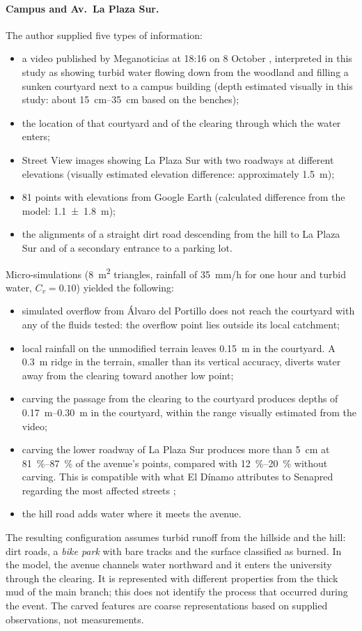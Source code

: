 \paragraph{Campus and Av.\ La Plaza Sur.} The author supplied five types of information:
\begin{itemize}
\item a video published by Meganoticias at 18:16 on 8 October \citep{meganoticias2026uandes}, interpreted in this study as showing turbid water flowing down from the woodland and filling a sunken courtyard next to a campus building (depth estimated visually in this study: about \SIrange{15}{35}{cm} based on the benches);
\item the location of that courtyard and of the clearing through which the water enters;
\item Street View images showing La Plaza Sur with two roadways at different elevations (visually estimated elevation difference: approximately \SI{1.5}{m});
\item 81 points with elevations from Google Earth (calculated difference from the model: \SI[uncertainty-mode=separate,retain-explicit-plus=true]{+1.1 +- 1.8}{m});
\item the alignments of a straight dirt road descending from the hill to La Plaza Sur and of a secondary entrance to a parking lot.
\end{itemize}
Micro-simulations (\SI{8}{m^2} triangles, rainfall of \SI{35}{mm/h} for one hour and turbid water, $C_v=0.10$) yielded the following:
\begin{itemize}
\item simulated overflow from Álvaro del Portillo does not reach the courtyard with any of the fluids tested: the overflow point lies outside its local catchment;
\item local rainfall on the unmodified terrain leaves \SI{0.15}{m} in the courtyard. A \SI{0.3}{m} ridge in the terrain, smaller than its vertical accuracy, diverts water away from the clearing toward another low point;
\item carving the passage from the clearing to the courtyard produces depths of \SIrange{0.17}{0.30}{m} in the courtyard, within the range visually estimated from the video;
\item carving the lower roadway of La Plaza Sur produces more than \SI{5}{cm} at \SIrange{81}{87}{\percent} of the avenue's points, compared with \SIrange{12}{20}{\percent} without carving. This is compatible with what El Dínamo attributes to Senapred regarding the most affected streets \citep{eldinamo2026};
\item the hill road adds water where it meets the avenue.
\end{itemize}
The resulting configuration assumes turbid runoff from the hillside and the hill: dirt roads, a \emph{bike park} with bare tracks and the surface classified as burned. In the model, the avenue channels water northward and it enters the university through the clearing. It is represented with different properties from the thick mud of the main branch; this does not identify the process that occurred during the event. The carved features are coarse representations based on supplied observations, not measurements.


